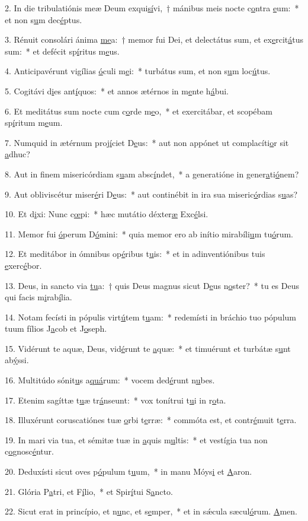 2. In die tribulatiónis meæ Deum exqui\uline{sí}vi,~† mánibus meis nocte c\uline{o}ntra \uline{e}um:~* et non s\uline{u}m dec\uline{é}ptus.\par 
3. Rénuit consolári ánima \uline{me}a:~† memor fui Dei, et delectátus sum, et ex\uline{e}rcit\uline{á}tus sum:~* et defécit sp\uline{í}ritus m\uline{e}us.\par 
4. Anticipavérunt vigílias \uline{ó}culi m\uline{e}i:~* turbátus sum, et non s\uline{u}m loc\uline{ú}tus.\par 
5. Cogitávi d\uline{i}es ant\uline{í}quos:~* et annos ætérnos in m\uline{e}nte h\uline{á}bui.\par 
6. Et meditátus sum nocte cum c\uline{o}rde m\uline{e}o,~* et exercitábar, et scopébam sp\uline{í}ritum m\uline{e}um.\par 
7. Numquid in ætérnum proj\uline{í}ciet D\uline{e}us:~* aut non appónet ut complacíti\uline{o}r sit \uline{a}dhuc?\par 
8. Aut in finem misericórdiam s\uline{u}am absc\uline{í}ndet,~* a generatióne in gener\uline{a}ti\uline{ó}nem?\par 
9. Aut obliviscétur miser\uline{é}ri D\uline{e}us:~* aut continébit in ira sua miseric\uline{ó}rdias s\uline{u}as?\par 
10. Et d\uline{i}xi: Nunc c\uline{œ}pi:~* hæc mutátio déxter\uline{æ} Exc\uline{é}lsi.\par 
11. Memor fui \uline{ó}perum D\uline{ó}mini:~* quia memor ero ab inítio mirabíli\uline{u}m tu\uline{ó}rum.\par 
12. Et meditábor in ómnibus op\uline{é}ribus t\uline{u}is:~* et in adinventiónibus tuis \uline{e}xerc\uline{é}bor.\par 
13. Deus, in sancto via \uline{tu}a:~† quis Deus magnus sicut D\uline{e}us n\uline{o}ster?~* tu es Deus qui facis m\uline{i}rab\uline{í}lia.\par 
14. Notam fecísti in pópulis virt\uline{ú}tem t\uline{u}am:~* redemísti in bráchio tuo pópulum tuum fílios J\uline{a}cob et J\uline{o}seph.\par 
15. Vidérunt te aquæ, Deus, vid\uline{é}runt te \uline{a}quæ:~* et timuérunt et turbátæ s\uline{u}nt ab\uline{ý}ssi.\par 
16. Multitúdo sónit\uline{u}s a\uline{quá}rum:~* vocem ded\uline{é}runt n\uline{u}bes.\par 
17. Etenim sagíttæ t\uline{u}æ tr\uline{á}nseunt:~* vox tonítrui t\uline{u}i in r\uline{o}ta.\par 
18. Illuxérunt coruscatiónes tuæ \uline{o}rbi t\uline{e}rræ:~* commóta est, et contr\uline{é}muit t\uline{e}rra.\par 
19. In mari via tua, et sémitæ tuæ in \uline{a}quis m\uline{u}ltis:~* et vestígia tua non c\uline{o}gnosc\uline{é}ntur.\par 
20. Deduxísti sicut oves p\uline{ó}pulum t\uline{u}um,~* in manu Móys\uline{i} et \uline{A}aron.\par 
21. Glória P\uline{a}tri, et F\uline{í}lio,~* et Spir\uline{í}tui S\uline{a}ncto.\par 
22. Sicut erat in princípio, et n\uline{u}nc, et s\uline{e}mper,~* et in sǽcula sæcul\uline{ó}rum. \uline{A}men.\par 
